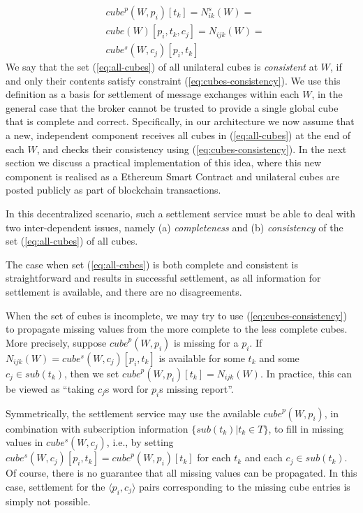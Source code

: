 \documentclass[chi_draft]{sigchi}
\begin{document}
{\begin{equation}\label{eq:cubes-consistency}
\begin{split}
& \mathit{cube}^p(W, p_i)[t_k] = N^s_{ik}(W) = \\
& \mathit{cube}(W)[p_i, t_k, c_j]  = N_{ijk}(W) = \\
& \mathit{cube^s}(W, c_j)[p_i, t_k]
\end{split}
\end{equation}
We say that the set (\ref{eq:all-cubes}) of all unilateral cubes is \textit{consistent} at $W$, if and only their contents satisfy constraint (\ref{eq:cubes-consistency}).
We use this definition as a basis for settlement of message exchanges within each $W$, in the general case that the broker cannot be trusted to provide a single global cube that is complete and correct.
%
Specifically, in our architecture we  now assume that a new, independent component receives all cubes in (\ref{eq:all-cubes}) at the end of each $W$, and checks their consistency using (\ref{eq:cubes-consistency}). 
In the next section we discuss a practical implementation of this idea, where this new component is realised as a Ethereum Smart Contract and unilateral cubes are posted publicly as part of blockchain transactions.

In this decentralized scenario, such a settlement service must be able to deal with two inter-dependent issues, namely (a) \textit{completeness} and (b) \textit{consistency} of the set (\ref{eq:all-cubes}) of all cubes.

The case when set (\ref{eq:all-cubes}) is both complete and consistent is straightforward and results in successful settlement, as all information for settlement is available, and there are no disagreements.

When the set of cubes is incomplete, we may try to use (\ref{eq:cubes-consistency}) to propagate missing values from the more complete to the less complete cubes. 
More precisely, suppose $ \mathit{cube}^p(W, p_i) $ is missing for a $p_i$.
If $ N_{ijk}(W) = \mathit{cube^s}(W, c_j)[p_i, t_k] $ is available for some $t_k$ and some $ c_j \in \mathit{sub}(t_k) $, then we set $  \mathit{cube}^p(W, p_i)[t_k]=  N_{ijk}(W) $.
In practice, this can be viewed as ``taking $ c_j $s word for $p_i$s missing report''.

Symmetrically, the settlement service may use the available $ \mathit{cube}^p(W, p_i)$, in combination with subscription information $ \{\mathit{sub}(t_k) | t_k \in T \}$, to fill in missing values in 
$  \mathit{cube^s}(W, c_j)  $, i.e., by setting 
$ \mathit{cube^s}(W, c_j)[p_i, t_k]  =  \mathit{cube}^p(W, p_i)[t_k]$ for each $t_k$ and each $c_j \in \mathit{sub}(t_k)$.
%
Of course, there is no guarantee that all missing values can be propagated. 
In this case, settlement for the $\langle p_i, c_j \rangle$ pairs corresponding to the missing cube entries is simply not possible.

}
\end{document}
